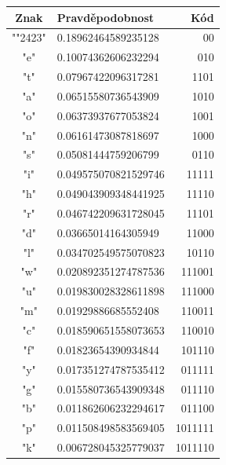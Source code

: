 \documentclass[12pt]{article}
\def\textvisiblespace{{\TVSp\char"2423}}
\begin{document}
			\begin{table}[!ht]
\centering
\begin{tabular}{ | c | l | r | } \hline
Znak    &       Pravděpodobnost &       Kód     \\ \hline
"\textvisiblespace "     &       0.18962464589235128     &       00      \\ \hline
"e"     &       0.10074362606232294     &       010     \\ \hline
"t"     &       0.07967422096317281     &       1101    \\ \hline
"a"     &       0.06515580736543909     &       1010    \\ \hline
"o"     &       0.06373937677053824     &       1001    \\ \hline
"n"     &       0.06161473087818697     &       1000    \\ \hline
"s"     &       0.05081444759206799     &       0110    \\ \hline
"i"     &       0.049575070821529746    &       11111   \\ \hline
"h"     &       0.049043909348441925    &       11110   \\ \hline
"r"     &       0.046742209631728045    &       11101   \\ \hline
"d"     &       0.03665014164305949     &       11000   \\ \hline
"l"     &       0.034702549575070823    &       10110   \\ \hline
"w"     &       0.020892351274787536    &       111001  \\ \hline
"u"     &       0.019830028328611898    &       111000  \\ \hline
"m"     &       0.01929886685552408     &       110011  \\ \hline
"c"     &       0.018590651558073653    &       110010  \\ \hline
"f"     &       0.01823654390934844     &       101110  \\ \hline
"y"     &       0.017351274787535412    &       011111  \\ \hline
"g"     &       0.015580736543909348    &       011110  \\ \hline
"b"     &       0.011862606232294617    &       011100  \\ \hline
"p"     &       0.011508498583569405    &       1011111 \\ \hline
"k"     &       0.006728045325779037    &       1011110 \\ \hline

\end{tabular}
\end{table}
\end{document}
